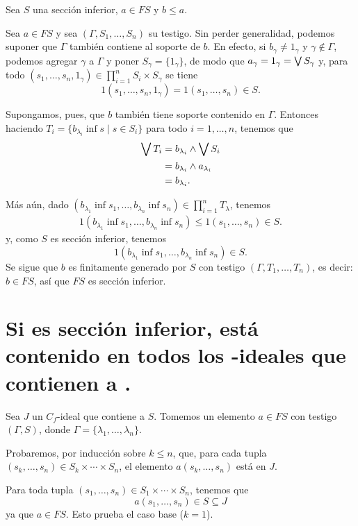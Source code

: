 Sea $S$ una sección inferior, $a\in FS$ y $b\leq a$.

Sea $a\in FS$ y sea $(\Gamma,S_1,\dots,S_n)$ su testigo.
Sin perder generalidad, podemos suponer que $\Gamma$ también
contiene al soporte de $b$.
En efecto, si $b_\gamma\neq 1_\gamma$ y $\gamma\not\in\Gamma$,
podemos agregar $\gamma$ a $\Gamma$ y poner
$S_\gamma = \{1_\gamma\}$,
de modo que $a_\gamma = 1_\gamma = \bigvee S_\gamma$
y, para todo
$(s_1,\dots,s_n,1_\gamma)\in\prod_{i=1}^nS_i\times S_\gamma$
se tiene
\[
  1(s_1,\dots,s_n,1_\gamma) = 1(s_1,\dots,s_n) \in S
.\]

Supongamos, pues, que $b$ también tiene soporte contenido en
$\Gamma$.
Entonces haciendo $T_i=\{b_{\lambda_i}\inf s \mid s\in S_i\}$
para todo $i=1,\dots,n$, tenemos que
\begin{align*}
  \bigvee T_i
  &= b_{\lambda_i}\wedge\bigvee S_i \\
  &= b_{\lambda_i}\wedge a_{\lambda_i} \\
  &= b_{\lambda_i}.
\end{align*}

Más aún, dado $(b_{\lambda_1}\inf s_1,\dots,b_{\lambda_n}\inf
s_n)\in \prod_{i=1}^n T_\lambda$, tenemos
\begin{align*}
  1(b_{\lambda_1}\inf s_1,\dots,b_{\lambda_n}\inf s_n)
  \leq 1(s_1,\dots,s_n) \in S.
\end{align*}
y, como $S$ es sección inferior, tenemos
\[
  1(b_{\lambda_1}\inf s_1,\dots,b_{\lambda_n}\inf s_n) \in S
.\]
Se sigue que $b$ es finitamente generado por $S$ con testigo
$(\Gamma,T_1,\dots,T_n)$, es decir: $b\in FS$,
así que $FS$ es sección inferior.

\section{Si  es sección inferior,  está contenido en todos los -ideales que contienen a .}

Sea $J$ un $C_f$-ideal que contiene a $S$.
Tomemos un elemento $a\in FS$ con testigo $(\Gamma,S)$, donde
$\Gamma=\{\lambda_1,\dots,\lambda_n\}$.

Probaremos, por inducción sobre $k\leq n$, que, para cada tupla
$(s_k,\dots,s_n)\in S_k\times\cdots\times S_n$, el elemento
$a(s_k,\dots,s_n)$ está en $J$.

Para toda tupla
$(s_1,\dots,s_n)\in S_1\times\cdots\times S_n$, tenemos que
\[
  a(s_1,\dots,s_n)\in S\subseteq J
\]
ya que $a\in FS$.
Esto prueba el caso base ($k=1$).


